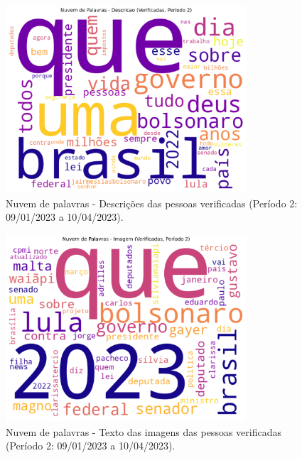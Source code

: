 \documentclass[manuscript,screen,review]{acmart}
\begin{document}
\begin{figure}[h]
\centering
\includegraphics[width=0.8\textwidth]{figura19_nuvem_verificadas_desc_periodo2.png}
\caption{Nuvem de palavras - Descrições das pessoas verificadas (Período 2: 09/01/2023 a 10/04/2023).}
\label{fig:figura19}
\end{figure}

\begin{figure}[h]
\centering
\includegraphics[width=0.8\textwidth]{figura20_nuvem_verificadas_img_periodo2.png}
\caption{Nuvem de palavras - Texto das imagens das pessoas verificadas (Período 2: 09/01/2023 a 10/04/2023).}
\label{fig:figura20}
\end{figure}
\end{document}

